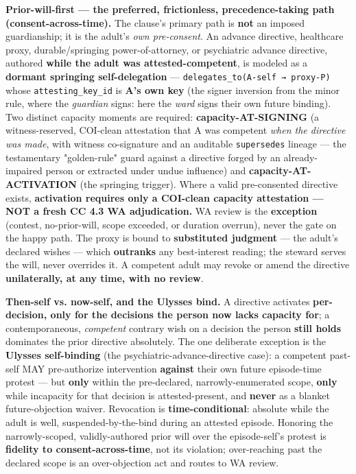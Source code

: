 \documentclass[11pt]{article}
\begin{document}
\textbf{Prior-will-first — the preferred, frictionless, precedence-taking path (consent-across-time).} The clause's primary path is \textbf{not} an imposed guardianship; it is the adult's \textit{own pre-consent}. An advance directive, healthcare proxy, durable/springing power-of-attorney, or psychiatric advance directive, authored \textbf{while the adult was attested-competent}, is modeled as a \textbf{dormant springing self-delegation} — \texttt{delegates\_to(A-self → proxy-P)} whose \texttt{attesting\_key\_id} is \textbf{A's own key} (the signer inversion from the minor rule, where the \textit{guardian} signs: here the \textit{ward} signs their own future binding). Two distinct capacity moments are required: \textbf{capacity-AT-SIGNING} (a witness-reserved, COI-clean attestation that A was competent \textit{when the directive was made}, with witness co-signature and an auditable \texttt{supersedes} lineage — the testamentary "golden-rule" guard against a directive forged by an already-impaired person or extracted under undue influence) and \textbf{capacity-AT-ACTIVATION} (the springing trigger). Where a valid pre-consented directive exists, \textbf{activation requires only a COI-clean capacity attestation — NOT a fresh CC 4.3 WA adjudication.} WA review is the \textbf{exception} (contest, no-prior-will, scope exceeded, or duration overrun), never the gate on the happy path. The proxy is bound to \textbf{substituted judgment} — the adult's declared wishes — which \textbf{outranks} any best-interest reading; the steward serves the will, never overrides it. A competent adult may revoke or amend the directive \textbf{unilaterally, at any time, with no review}.


\textbf{Then-self vs. now-self, and the Ulysses bind.} A directive activates \textbf{per-decision, only for the decisions the person now lacks capacity for}; a contemporaneous, \textit{competent} contrary wish on a decision the person \textbf{still holds} dominates the prior directive absolutely. The one deliberate exception is the \textbf{Ulysses self-binding} (the psychiatric-advance-directive case): a competent past-self MAY pre-authorize intervention \textbf{against} their own future episode-time protest — but \textbf{only} within the pre-declared, narrowly-enumerated scope, \textbf{only} while incapacity for that decision is attested-present, and \textbf{never} as a blanket future-objection waiver. Revocation is \textbf{time-conditional}: absolute while the adult is well, suspended-by-the-bind during an attested episode. Honoring the narrowly-scoped, validly-authored prior will over the episode-self's protest is \textbf{fidelity to consent-across-time}, not its violation; over-reaching past the declared scope is an over-objection act and routes to WA review.
\end{document}
